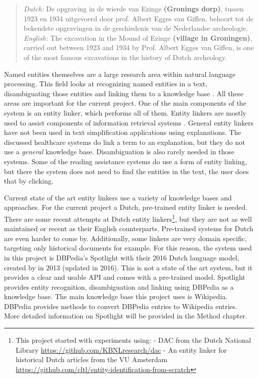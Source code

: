 \documentclass[
10pt, %
a4paper, %
oneside, %
headinclude,footinclude, %
] {book}%
\begin{document}
\begin{quote}
  \textit{Dutch:} De opgraving in de wierde van Ezinge \textbf{(Gronings dorp)}, tussen 1923 en 1934 uitgevoerd door prof. Albert Egges van Giffen, behoort tot de bekendste opgravingen in de geschiedenis van de Nederlandse archeologie.\newline
  \textit{English:} The excavation in the Mound of Ezinge \textbf{(village in Groningen)}, carried out between 1923 and 1934 by Prof. Albert Egges van Giffen, is one of the most famous excavations in the history of Dutch archeology.
\end{quote}

Named entities themselves are a large research area within natural language processing.
This field looks at recognizing named entities in a text, disambiguating those entities and linking them to a knowledge base \citep{shen2015,vanhulst2020}.
All these areas are important for the current project.
One of the main components of the system is an entity linker, which performs all of them.
Entity linkers are mostly used to assist components of information retrieval systems \citep{delpeuch2019,vanhulst2020}.
General entity linkers have not been used in text simplification applications using explanations.
The discussed healthcare systems do link a term to an explanation, but they do not use a \textit{general} knowledge base.
Disambiguation is also rarely needed in those systems.
Some of the reading assistance systems do use a form of entity linking, but there the system does not need to find the entities in the text, the user does that by clicking.

Current state of the art entity linkers use a variety of knowledge bases and approaches.
For the current project a Dutch, pre-trained entity linker is needed.
There are some recent attempts at Dutch entity linkers\footnote{This project started with experiments using:\newline
  - DAC from the Dutch National Library \url{https://github.com/KBNLresearch/dac} \newline
  - An entity linker for historical Dutch articles from the VU Amsterdam \url{https://github.com/cltl/entity-identification-from-scratch}}, but they are not as well maintained or recent as their English counterparts.
Pre-trained systems for Dutch are even harder to come by.
Additionally, some linkers are very domain specific, targeting only historical documents for example.
For this reason, the system used in this project is DBPedia's Spotlight with their 2016 Dutch language model, created by \citeauthor{daiber2013} in 2013 (updated in 2016).
This is not a state of the art system, but it provides a clear and usable API and comes with a pre-trained model.
Spotlight provides entity recognition, disambiguation and linking using DBPedia as a knowledge base.
The main knowledge base this project uses is Wikipedia.
DBPedia provides methods to convert DBPedia entries to Wikipedia entries.
More detailed information on Spotlight will be provided in the Method chapter.
\end{document}
